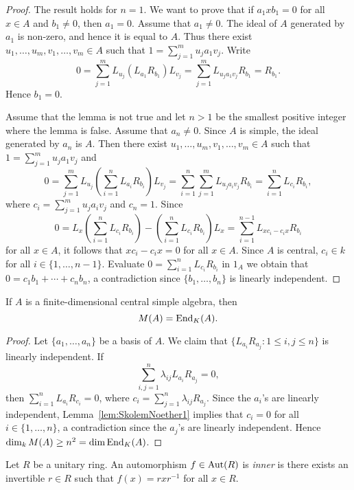 \begin{proof}
The result holds for $n=1$. We want to prove that 
if  $a_1xb_1=0$ for all $x\in A$ and $b_1\ne0$, then
	$a_1=0$. Assume that $a_1\ne 0$. The ideal of $A$ generated by 
	$a_1$ is non-zero, and hence it is equal to $A$. Thus there exist 
	$u_1,\dots,u_m,v_1,\dots,v_m\in A$ such that $1=\sum_{j=1}^m u_ja_1v_j$.
	Write  
	\[
		0=\sum_{j=1}^m L_{u_j}(L_{a_1}R_{b_1})L_{v_j}
        =\sum_{j=1}^m L_{u_ja_1v_j}R_{b_1}=R_{b_1}.
	\]
	Hence $b_1=0$. 

	Assume that the lemma is not true and let $n>1$ be the smallest positive
 integer where the lemma is false. 
    Assume that $a_n\ne 0$. Since $A$ is simple, the ideal generated by 
	 $a_n$ is $A$. Then there exist 
  	$u_1,\dots,u_m,v_1,\dots,v_m\in A$ such that $1=\sum_{j=1}^m u_ja_1v_j$ and 
	\[
		0=\sum_{j=1}^m L_{u_j}\left(\sum_{i=1}^n L_{a_i}R_{b_i}\right)L_{v_j}=\sum_{i=1}^n\sum_{j=1}^m L_{u_ja_iv_j}R_{b_i}=\sum_{i=1}^n L_{c_i}R_{b_i},
	\]
	where $c_i=\sum_{j=1}^m u_ja_iv_j$ and $c_n=1$. Since 
	\[
		0=L_x\left(\sum_{i=1}^n L_{c_i}R_{b_i}\right)-\left(\sum_{i=1}^n L_{c_i}R_{b_i}\right)L_x=\sum_{i=1}^{n-1}L_{xc_i-c_ix}R_{b_i}
	\]
	for all $x\in A$, it follows that $xc_i-c_ix=0$ for all 
	 $x\in A$. Since $A$ is central, $c_i\in k$ for all
	$i\in\{1,\dots,n-1\}$. Evaluate $0=\sum_{i=1}^n L_{c_i}R_{b_i}$ in $1_A$
	we obtain that $0=c_1b_1+\cdots+c_nb_n$, a contradiction since 
	$\{b_1,\dots,b_n\}$ is linearly independent. 
\end{proof}

\begin{lemma}
	\label{lem:SkolemNoether2}
	If $A$ is a finite-dimensional central simple algebra, then 
        \[
        M(A)=\operatorname{End}_K(A).
        \]
\end{lemma}

\begin{proof}
	Let $\{a_1,\dots,a_n\}$ be a basis of $A$. We claim that  
	$\{L_{a_i}R_{a_j}:1\leq i,j\leq n\}$ is linearly independent. If 
	\[
        \sum_{i,j=1}^n\lambda_{ij}L_{a_i}R_{a_j}=0,
        \]
        then 
	$\sum_{i=1}^nL_{a_i}R_{c_i}=0$, where
	$c_i=\sum_{j=1}^n\lambda_{ij}R_{a_j}$. Since the $a_i$'s are linearly 
 independent, Lemma~\ref{lem:SkolemNoether1} implies that $c_i=0$ for all 
	 $i\in\{1,\dots,n\}$, a contradiction since the $a_j$'s are linearly independent.   
	Hence $\dim_kM(A)\geq n^2=\dim\operatorname{End}_K(A)$.
\end{proof}

\begin{definition}
	Let $R$ be a unitary ring. An automorphism $f\in\operatorname{Aut}(R)$ is 
	\emph{inner} is there exists an invertible $r\in R$ such that 
	$f(x)=rxr^{-1}$ for all $x\in R$.
\end{definition}

